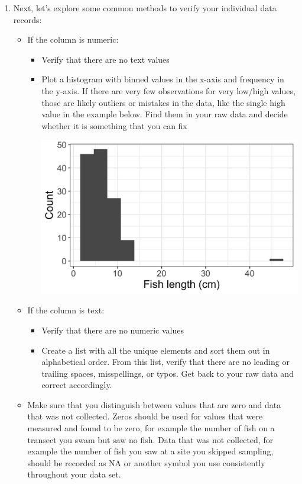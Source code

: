 \documentclass[
]{book}
\begin{document}
\begin{enumerate}
\def\labelenumi{\arabic{enumi}.}
\setcounter{enumi}{2}
\item
  Next, let's explore some common methods to verify your individual data records:

  \begin{itemize}
  \item
    If the column is numeric:

    \begin{itemize}
    \item
      Verify that there are no text values
    \item
      Plot a histogram with binned values in the x-axis and frequency in the y-axis. If there are very few observations for very low/high values, those are likely outliers or mistakes in the data, like the single high value in the example below. Find them in your raw data and decide whether it is something that you can fix

      \includegraphics{images/M2S2_image3_data_cleaning_histogram.png}
    \end{itemize}
  \item
    If the column is text:

    \begin{itemize}
    \item
      Verify that there are no numeric values
    \item
      Create a list with all the unique elements and sort them out in alphabetical order. From this list, verify that there are no leading or trailing spaces, misspellings, or typos. Get back to your raw data and correct accordingly.
    \end{itemize}
  \item
    Make sure that you distinguish between values that are zero and data that was not collected. Zeros should be used for values that were measured and found to be zero, for example the number of fish on a transect you swam but saw no fish. Data that was not collected, for example the number of fish you saw at a site you skipped sampling, should be recorded as NA or another symbol you use consistently throughout your data set.
  \end{itemize}
\end{enumerate}
\end{document}
